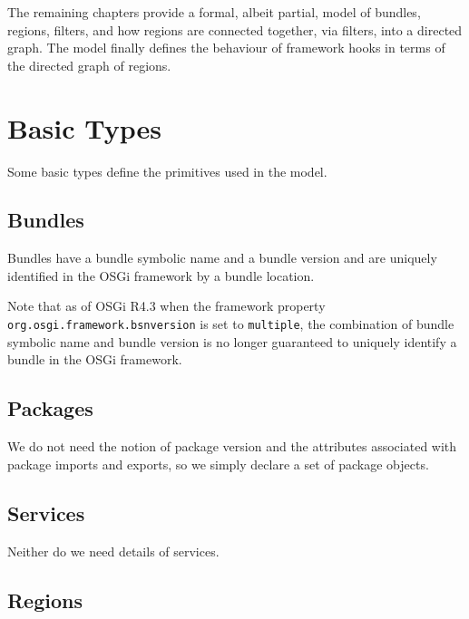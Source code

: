 \documentclass[a4paper,9pt]{article}
\begin{document}
The remaining chapters provide a formal, albeit partial, model of bundles, regions, filters, and how
regions are connected together, via filters, into a directed graph.
The model finally defines the behaviour of framework hooks in terms of the directed graph of regions.

\clearpage
\section{Basic Types}
\label{cha:basics}

Some basic types define the primitives used in the model.

\subsection*{Bundles}

Bundles have a bundle symbolic name and a bundle version and are uniquely identified in the
OSGi framework by a bundle location.
\begin{zed}
\end{zed}
Note that as of OSGi R4.3 when the framework property \texttt{org.osgi.framework.bsnversion}
is set to \texttt{multiple}, the combination of bundle symbolic name and bundle version is no
longer guaranteed to uniquely identify a bundle in the OSGi framework.

\subsection*{Packages}

We do not need the notion of package version and the attributes associated with package imports
and exports, so we simply declare a set of package objects.
\begin{zed}
  [Package]
\end{zed}

\subsection*{Services}

Neither do we need details of services.
\begin{zed}
  [Service]
\end{zed}

\subsection*{Regions}
\end{document}
